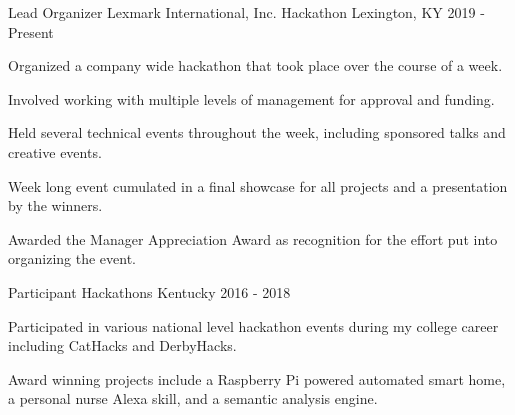 

\begin{cventries}

  \cventry
    {Lead Organizer} %
    {Lexmark International, Inc. Hackathon} %
    {Lexington, KY} %
    {2019 - Present} %
    {
      \begin{cvitems} %
        \item {Organized a company wide hackathon that took place over the course of a week.}
        \item {Involved working with multiple levels of management for approval and funding.}
        \item {Held several technical events throughout the week, including sponsored talks and creative events.}
	\item {Week long event cumulated in a final showcase for all projects and a presentation by the winners.}
	\item {Awarded the Manager Appreciation Award as recognition for the effort put into organizing the event.}
      \end{cvitems}
    }

  \cventry
    {Participant} %
    {Hackathons} %
    {Kentucky} %
    {2016 - 2018} %
    {
      \begin{cvitems} %
        \item {Participated in various national level hackathon events during my college career including CatHacks and DerbyHacks.}
	\item {Award winning projects include a Raspberry Pi powered automated smart home, a personal nurse Alexa skill, and a semantic analysis engine.}
      \end{cvitems}
    }

\iffalse
  \cventry
    {Member} %
    {Competative Programming Team} %
    {University of Kentucky} %
    {Aug. 2015 - 2017} %
    {
      \begin{cvitems} %
        \item {Represented the university in national programming competitions.}
      \end{cvitems}
    }
\fi
\end{cventries}
